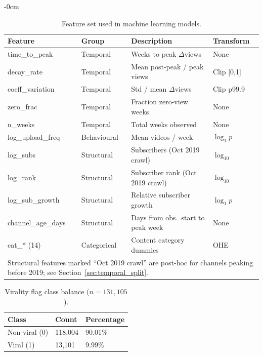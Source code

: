 \documentclass[journal,article,submit,pdftex,moreauthors]{Definitions/mdpi}
\begin{document}
\begin{adjustwidth}{-\extralength}{0cm}
\begin{table}[H]
\caption{Feature set used in machine learning models.\label{tab:features}}
\begin{tabularx}{\textwidth}{llll}
\toprule
\textbf{Feature}&\textbf{Group}&\textbf{Description}&\textbf{Transform}\\
\midrule
time\_to\_peak     & Temporal    & Weeks to peak $\Delta$views          & None \\
decay\_rate        & Temporal    & Mean post-peak / peak views           & Clip [0,1] \\
coeff\_variation   & Temporal    & Std / mean $\Delta$views              & Clip p99.9 \\
zero\_frac         & Temporal    & Fraction zero-view weeks              & None \\
n\_weeks           & Temporal    & Total weeks observed                  & None \\
log\_upload\_freq  & Behavioural & Mean videos / week                    & $\log_{1}p$ \\
log\_subs          & Structural  & Subscribers (Oct 2019 crawl)          & $\log_{10}$ \\
log\_rank          & Structural  & Subscriber rank (Oct 2019 crawl)      & $\log_{10}$ \\
log\_sub\_growth   & Structural  & Relative subscriber growth            & $\log_{1}p$ \\
channel\_age\_days & Structural  & Days from obs.\ start to peak week   & None \\
cat\_* (14)        & Categorical & Content category dummies              & OHE \\
\bottomrule
\multicolumn{4}{l}{\footnotesize Structural features marked ``Oct 2019 crawl'' are
post-hoc for channels peaking before 2019; see Section~\ref{sec:temporal_split}.}
\end{tabularx}
\end{table}

\begin{table}[H]
\caption{Virality flag class balance ($n = 131{,}105$).\label{tab:balance}}
\begin{tabularx}{\textwidth}{lll}
\toprule
\textbf{Class}&\textbf{Count}&\textbf{Percentage}\\
\midrule
Non-viral (0) & 118,004 & 90.01\% \\
Viral (1)     &  13,101 &  9.99\% \\
\bottomrule
\end{tabularx}
\end{table}


\end{adjustwidth}
\end{document}
